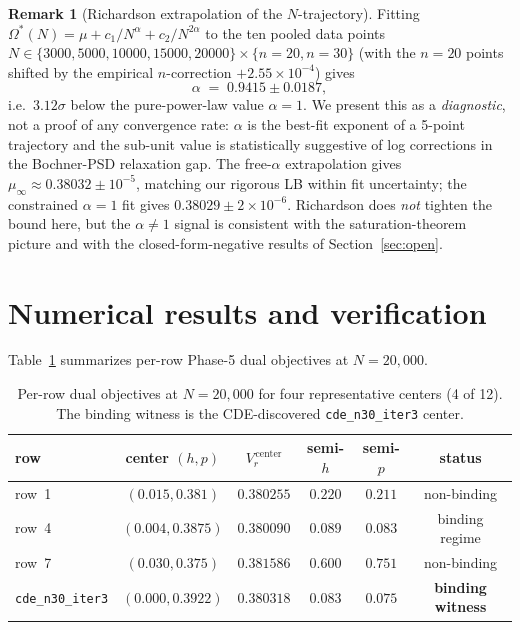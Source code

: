 \documentclass[11pt]{article}
\theoremstyle{plain}
\theoremstyle{definition}
\newtheorem{remark}[theorem]{Remark}
\begin{document}
\begin{remark}[Richardson extrapolation of the $N$-trajectory]\label{rem:richardson}
Fitting $\Omega^*(N) = \mu + c_1/N^\alpha + c_2/N^{2\alpha}$ to the
ten pooled data points $N \in \{3000, 5000, 10000, 15000, 20000\}
\times \{n = 20, n = 30\}$ (with the $n = 20$ points shifted by the
empirical $n$-correction $+2.55 \times 10^{-4}$) gives
\[
\alpha \;=\; 0.9415 \pm 0.0187,
\]
i.e.\ $3.12\sigma$ below the pure-power-law value $\alpha = 1$. We
present this as a \emph{diagnostic}, not a proof of any convergence
rate: $\alpha$ is the best-fit exponent of a 5-point trajectory and
the sub-unit value is statistically suggestive of log corrections in
the Bochner-PSD relaxation gap. The free-$\alpha$ extrapolation gives
$\mu_\infty \approx 0.38032 \pm 10^{-5}$, matching our rigorous LB
within fit uncertainty; the constrained $\alpha = 1$ fit gives
$0.38029 \pm 2 \times 10^{-6}$. Richardson does \emph{not} tighten the
bound here, but the $\alpha \ne 1$ signal is consistent with the
saturation-theorem picture and with the closed-form-negative results
of Section~\ref{sec:open}.
\end{remark}

\section{Numerical results and verification}

Table~\ref{tab:results} summarizes per-row Phase-5 dual objectives at
$N = 20{,}000$.

\begin{table}[h]
\centering
\small
\begin{tabular}{lccccc}
\toprule
row & center $(h, p)$ & $V_r^{\,\text{center}}$ & semi-$h$ & semi-$p$ & status \\
\midrule
row~1 & $(0.015, 0.381)$ & $0.380255$ & $0.220$ & $0.211$ & non-binding \\
row~4 & $(0.004, 0.3875)$ & $0.380090$ & $0.089$ & $0.083$ & binding regime \\
row~7 & $(0.030, 0.375)$ & $0.381586$ & $0.600$ & $0.751$ & non-binding \\
\texttt{cde\_n30\_iter3} & $(0.000, 0.3922)$ & $0.380318$ & $0.083$ & $0.075$ & \textbf{binding witness} \\
\bottomrule
\end{tabular}
\caption{Per-row dual objectives at $N = 20{,}000$ for four
representative centers (4 of 12). The binding witness is the
CDE-discovered \texttt{cde\_n30\_iter3} center.}
\label{tab:results}
\end{table}
\end{document}
